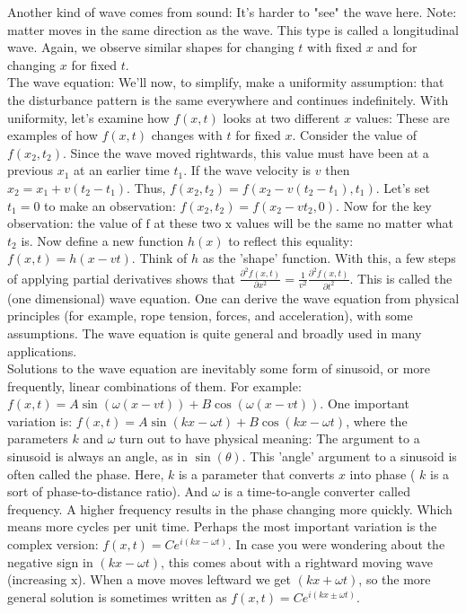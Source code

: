 \documentclass[main.tex]{subfiles}
\begin{document}
Another kind of wave comes from sound: It's harder to "see" the wave here. Note: matter moves in the same direction as the wave. This type is called a longitudinal wave. Again, we observe similar shapes for changing $t$ with fixed $x$ and for changing $x$ for fixed $t$.\\

The wave equation: We'll now, to simplify, make a uniformity assumption: that the disturbance pattern is the same everywhere and continues indefinitely. With uniformity, let's examine how $f(x, t)$ looks at two different $x$ values: These are examples of how $f(x, t)$ changes with $t$ for fixed $x$. Consider the value of $f\left(x_{2}, t_{2}\right)$. Since the wave moved rightwards, this value must have been at a previous $x_{1}$ at an earlier time $t_{1}$. If the wave velocity is $v$ then $x_{2}=x_{1}+v\left(t_{2}-t_{1}\right)$. Thus, $f\left(x_{2}, t_{2}\right)=f\left(x_{2}-v\left(t_{2}-t_{1}\right), t_{1}\right)$. Let's set $t_{1}=0$ to make an observation: $f\left(x_{2}, t_{2}\right)=f\left(x_{2}-v t_{2}, 0\right)$. Now for the key observation: the value of $\mathrm{f}$ at these two $\mathrm{x}$ values will be the same no matter what $t_{2}$ is. Now define a new function $h(x)$ to reflect this equality: $f(x, t)=h(x-v t)$. Think of $h$ as the 'shape' function. With this, a few steps of applying partial derivatives shows that $\frac{\partial^{2} f(x, t)}{\partial x^{2}}=\frac{1}{v^{2}} \frac{\partial^{2} f(x, t)}{\partial t^{2}}$. This is called the (one dimensional) wave equation. One can derive the wave equation from physical principles (for example, rope tension, forces, and acceleration), with some assumptions. The wave equation is quite general and broadly used in many applications.\\

Solutions to the wave equation are inevitably some form of sinusoid, or more frequently, linear combinations of them. For example: $f(x, t)=A \sin (\omega(x-v t))+B \cos (\omega(x-v t))$. One important variation is: $f(x, t)=A \sin (k x-\omega t)+B \cos (k x-\omega t)$, where the parameters $k$ and $\omega$ turn out to have physical meaning: The argument to a sinusoid is always an angle, as in $\sin (\theta)$. This 'angle' argument to a sinusoid is often called the phase. Here, $k$ is a parameter that converts $x$ into phase ( $k$ is a sort of phase-to-distance ratio). And $\omega$ is a time-to-angle converter called frequency. A higher frequency results in the phase changing more quickly. Which means more cycles per unit time. Perhaps the most important variation is the complex version: $f(x, t)=C e^{i(k x-\omega t)}$. In case you were wondering about the negative sign in $(k x-\omega t)$, this comes about with a rightward moving wave (increasing $\mathrm{x}$). When a move moves leftward we get $(k x+\omega t)$, so the more general solution is sometimes written as $f(x, t)=C e^{i(k x \pm \omega t)}$.\\
\end{document}
